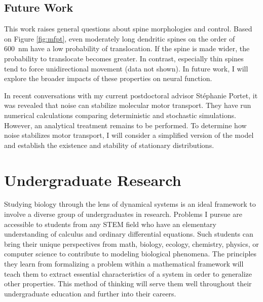 \documentclass[a4paper,11pt]{article}
\begin{document}
	\subsection{Future Work}
	This work raises general questions about spine morphologies and control. Based on Figure \ref{fig:mfpt}, even moderately long dendritic spines on the order of \SI{600}{\nm} have a low probability of translocation. If the spine is made wider, the probability to translocate becomes greater. In contrast, especially thin spines tend to force unidirectional movement (data not shown). In future work, I will explore the broader impacts of these properties on neural function. %
	
	In recent conversations with my current postdoctoral advisor St\'{e}phanie Portet, it was revealed that noise can stabilize molecular motor transport. They have run numerical calculations comparing deterministic and stochastic simulations. However, an analytical treatment remains to be performed. To determine how noise stabilizes motor transport, I will consider a simplified version of the model and establish the existence and stability of stationary distributions.
	
	\section{Undergraduate Research}\label{sec:undergrad}
	
	Studying biology through the lens of dynamical systems is an ideal framework to involve a diverse group of undergraduates in research. Problems I pursue are accessible to students from any STEM field who have an elementary understanding of calculus and ordinary differential equations. Such students can bring their unique perspectives from math, biology, ecology, chemistry, physics, or computer science to contribute to modeling biological phenomena. The principles they learn from formalizing a problem within a mathematical framework will teach them to extract essential characteristics of a system in order to generalize other properties. This method of thinking will serve them well throughout their undergraduate education and further into their careers.
	
\end{document}
